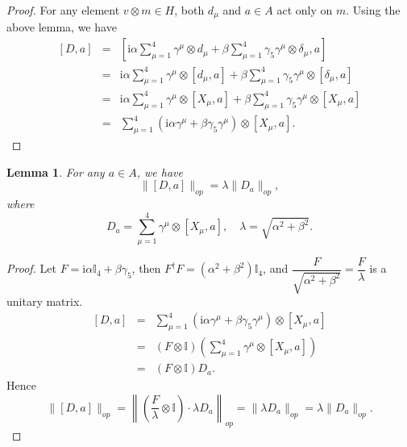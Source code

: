 \documentclass[a4paper,11pt]{article}
\newtheorem{lemma}{Lemma}
\begin{document}
\begin{proof}
  For any element $v \otimes m \in H$, both $d_{\mu}$ and $a \in A$ act only
  on $m$. Using the above lemma, we have
\begin{eqnarray}
	{}[D, a] & = & \left[ \mathrm{i} \alpha \sum_{\mu = 1}^4 \gamma^{\mu} \otimes d_{\mu}
	+ \beta \sum_{\mu = 1}^4 \gamma_5 \gamma^{\mu} \otimes \delta_{\mu}, a
	\right] \nonumber\\
	& = & \mathrm{i} \alpha \sum_{\mu = 1}^4 \gamma^{\mu} \otimes [d_{\mu}, a] + \beta
	\sum_{\mu = 1}^4 \gamma_5 \gamma^{\mu} \otimes [\delta_{\mu}, a] \nonumber\\
	& = & \mathrm{i} \alpha \sum_{\mu = 1}^4 \gamma^{\mu} \otimes [X_{\mu}, a] + \beta
	\sum_{\mu = 1}^4 \gamma_5 \gamma^{\mu} \otimes [X_{\mu}, a] \nonumber\\
	& = & \sum_{\mu = 1}^4 (\mathrm{i} \alpha \gamma^{\mu} + \beta \gamma_5
	\gamma^{\mu}) \otimes [X_{\mu}, a] . 
\end{eqnarray}
\end{proof}

\begin{lemma}
  For any $a \in A$, we have
  \begin{equation}\label{da}
    \|[D, a]\|_{op} = \lambda   \|D_a \|_{op},
  \end{equation}
  where
  \begin{equation}
    D_a = \sum_{\mu = 1}^4 \gamma^{\mu} \otimes [X_{\mu}, a], \quad \lambda =
    \sqrt{\alpha^2 + \beta^2} .
  \end{equation}
\end{lemma}

\begin{proof}
  Let $F = \mathrm{i} \alpha \mathbb{I}_4 + \beta \gamma_5$, then $F^{\dag} F =
  (\alpha^2 + \beta^2) \mathbb{I}_4$, and $\dfrac{F}{\sqrt{\alpha^2 + \beta^2}}
  = \dfrac{F}{\lambda}$ is a unitary matrix.
  \begin{eqnarray}
    {}[D, a] & = & \sum_{\mu = 1}^4 (\mathrm{i} \alpha \gamma^{\mu} + \beta \gamma_5
    \gamma^{\mu}) \otimes [X_{\mu}, a] \nonumber\\
    & = & (F \otimes \mathbb{I}) \left( \sum_{\mu = 1}^4 \gamma^{\mu} \otimes
    [X_{\mu}, a] \right) \nonumber\\
    & = & (F \otimes \mathbb{I}) D_a . 
  \end{eqnarray}
  Hence
  \begin{equation}
    \|[D, a]\|_{op} = \left\| \left( \dfrac{F}{\lambda} \otimes \mathbb{I} \right)
    \cdot \lambda D_a \right\|_{op} = \| \lambda D_a \|_{op} = \lambda \|D_a
    \|_{op} .
  \end{equation}
  
\end{proof}
\end{document}
